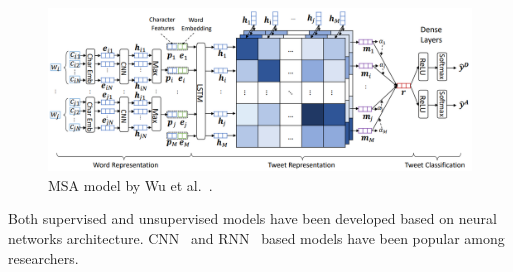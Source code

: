 \begin{figure}[h]
	\centering
	\includegraphics[width=0.99\linewidth]{Figures/k.png}
	\caption{MSA model by Wu et al.~\cite{wu2019msa, wu2018detecting}.}
	\label{fig:architecture-wu-msa} 
\end{figure}

Both supervised and unsupervised models have been developed based on neural networks architecture. CNN~\cite{wu2019msa, huynh2016adverse, lee2017adverse} and RNN~\cite{TUTUBALINA201893, huynh2016adverse} based models have been popular among researchers.